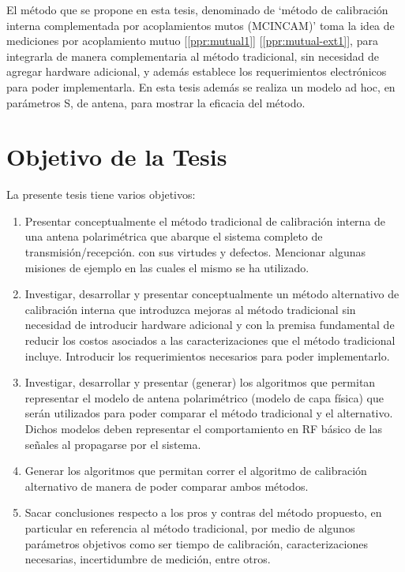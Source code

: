 El método que se propone en esta tesis, denominado de \enquote*{método de calibración interna complementada por acoplamientos 
mutos (MCINCAM)} toma la idea de mediciones por acoplamiento mutuo [\ref{ppr:mutual1}]\cite{Shipley2000} \cite{Aumann1989}
[\ref{ppr:mutual-ext1}], para integrarla de manera complementaria al método tradicional, sin necesidad de agregar hardware 
adicional, y además establece los requerimientos electrónicos para poder implementarla. En esta tesis además se realiza un modelo 
ad hoc, en parámetros S, de antena, para mostrar la eficacia del método. 


\section{Objetivo de la Tesis}

La presente tesis tiene varios objetivos:

\begin{enumerate}
    \item Presentar conceptualmente el método tradicional de calibración interna de una antena polarimétrica que abarque el 
			sistema completo de transmisión/recepción. con sus virtudes y defectos. Mencionar algunas misiones de ejemplo en
			las cuales el mismo se ha utilizado.
    \item Investigar, desarrollar y presentar conceptualmente un método alternativo de calibración interna que introduzca 
			mejoras al método tradicional sin necesidad de introducir hardware adicional y con la premisa fundamental de 
			reducir los costos asociados a las caracterizaciones que el método tradicional incluye. Introducir los 
			requerimientos necesarios para poder implementarlo.
    \item Investigar, desarrollar y presentar (generar) los algoritmos que permitan representar el modelo de antena 
			polarimétrico (modelo de capa física) que serán utilizados para poder comparar el método tradicional y el 
			alternativo. Dichos modelos deben representar el comportamiento en RF básico de las señales al propagarse por el 
			sistema.
    \item Generar los algoritmos que permitan correr el algoritmo de calibración alternativo de manera de poder comparar ambos 
			métodos.
    \item Sacar conclusiones respecto a los pros y contras del método propuesto, en particular en referencia al método 
			tradicional, por medio de algunos parámetros objetivos como ser tiempo de calibración, caracterizaciones necesarias, 
			incertidumbre de medición, entre otros.
\end{enumerate}    


